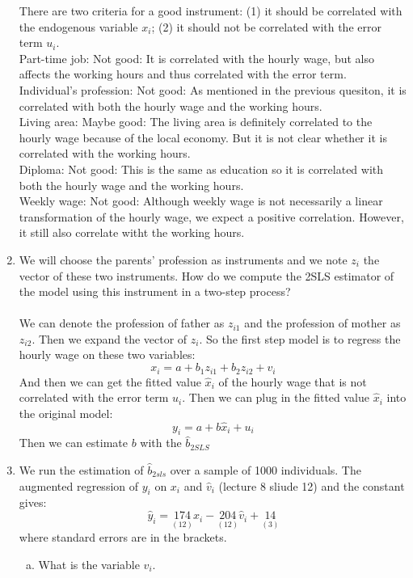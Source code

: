 \documentclass[12pt]{article}
\begin{document}
\begin{flushleft}
\begin{enumerate}
    There are two criteria for a good instrument: (1) it should be correlated with the endogenous variable $x_i$; (2) it should not be correlated with the error term $u_i$.\\
    Part-time job: Not good: It is correlated with the hourly wage, but also affects the working hours and thus correlated with the error term.\\
    Individual's profession: Not good: As mentioned in the previous quesiton, it is correlated with both the hourly wage and the working hours.\\
    Living area: Maybe good: The living area is definitely correlated to the hourly wage because of the local economy. But it is not clear whether it is correlated with the working hours.\\
    Diploma: Not good: This is the same as education so it is correlated with both the hourly wage and the working hours.\\
    Weekly wage: Not good: Although weekly wage is not necessarily a linear transformation of the hourly wage, we expect a positive correlation. However, it still also correlate witht the working hours.\\
    \item We will choose the parents’ profession as instruments and we note $z_i$ the vector of these two instruments. How do we compute the 2SLS estimator of the model using this instrument in a two-step process?\\~\\
    We can denote the profession of father as $z_{i1}$ and the profession of mother as $z_{i2}$. Then we expand the vector of $z_i$. So the first step model is to regress the hourly wage on these two variables:
    \[
    x_i=a+b_1z_{i1}+b_2z_{i2}+v_i
    \]
    And then we can get the fitted value $\hat{x}_i$ of the hourly wage that is not correlated with the error term $u_i$.
    Then we can plug in the fitted value $\hat{x}_i$ into the original model:
    \[
    y_i=a+b\hat{x}_i +u_i
    \]
    Then we can estimate $b$ with the $\hat{b}_{2SLS}$
    \item We run the estimation of $\hat{b}_{2sls}$ over a sample of 1000 individuals. The augmented regression of $y_i$ on $x_i$ and $\hat{v}_i$ (lecture 8 sliude 12) and the constant gives:
    \[
    \hat{y}_i=\underset{(12)}{174}x_i-\underset{(12)}{204}\hat{v}_i+\underset{(3)}{14}
    \]
    where standard errors are in the brackets.
    \begin{enumerate}[(a)]
    \item What is the variable $\hat{v}_i$.\\~\\

\end{enumerate}
\end{enumerate}
\end{flushleft}
\end{document}
